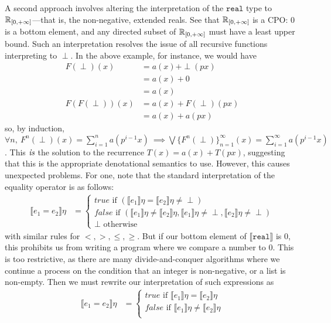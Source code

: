 A second approach involves altering the interpretation of the $\texttt{real}$ type to 
$\mathbb{R}_{[0,+\infty]}$---that is, the non-negative, extended reals. See that $\mathbb{R}_{[0,+\infty]}$ is a CPO: $0$ is a bottom element,
and any directed subset of $\mathbb{R}_{[0,+\infty]}$ must have a least upper bound. Such an interpretation
resolves the issue of all recursive functions interpreting to $\perp$. In the above example, for instance, we would have
\begin{align*}
F(\perp)(x) &= a(x) + \perp(px)\\
&= a(x) + 0 \\
&= a(x) \\
F(F(\perp))(x) &= a(x) + F(\perp)(px) \\
&= a(x) + a(px)
\end{align*}
so, by induction, 
$\forall n, \ F^n(\perp)(x) = \sum_{i=1}^{n}a(p^{i-1}x) \ \implies \bigvee\{F^n(\perp)\}^{\infty}_{n=1}(x) = \sum_{i=1}^{\infty}
a(p^{i-1}x)$. This $\emph{is}$ the solution to the recurrence $T(x) = a(x) + T(px)$, suggesting that this is the 
appropriate denotational semantics to use. However, this causes unexpected problems. For one, note that
 the standard interpretation of the equality operator is as follows:
\begin{align*}
 \llbracket e_1 = e_2 \rrbracket\eta &= 
 \begin{cases} 
      true \text{ if } (\llbracket e_1 \rrbracket\eta = \llbracket e_2 \rrbracket\eta \neq \perp) \\
      false \text{  if } (\llbracket e_1 \rrbracket\eta \neq \llbracket e_2\rrbracket\eta, \llbracket e_1 \rrbracket\eta \neq \perp, \llbracket e_2 \rrbracket\eta \neq \perp)\\
      \perp \text{ otherwise}
   \end{cases} 
\end{align*}
with similar rules for $<, >, \leq, \geq$. But if our bottom element of $\llbracket \texttt{real} \rrbracket$ is $0$, this 
prohibits us from writing a program where we compare a number to $0$. This is too restrictive, as there are many 
divide-and-conquer algorithms where we continue a process on the condition that an integer is non-negative, or a 
list is non-empty. Then we must rewrite our interpretation of such expressions as
\begin{align*}
 \llbracket e_1 = e_2 \rrbracket\eta &= 
 \begin{cases} 
      true \text{ if } \llbracket e_1 \rrbracket\eta = \llbracket e_2 \rrbracket\eta \\
      false \text{  if } \llbracket e_1 \rrbracket\eta \neq \llbracket e_2\rrbracket\eta\\
   \end{cases} 
\end{align*}

